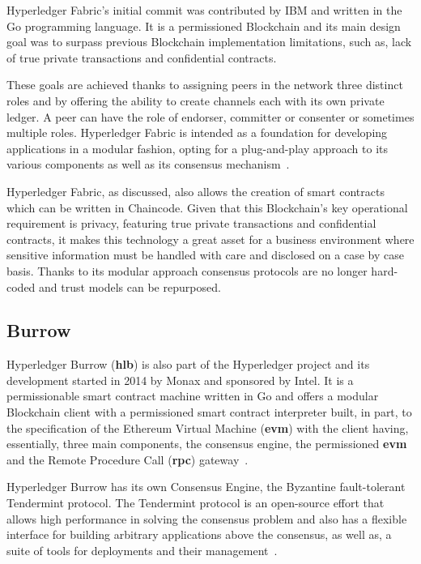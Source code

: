   Hyperledger Fabric’s initial commit was contributed by IBM and written in the
  Go programming language.  It is a permissioned Blockchain and its main design
  goal was to surpass previous Blockchain implementation limitations, such as,
  lack of true private transactions and confidential contracts.

  These goals are achieved thanks to assigning peers in the network three
  distinct roles and by offering the ability to create channels each with its
  own private ledger.  A peer can have the role of endorser, committer or
  consenter or sometimes multiple roles.  Hyperledger Fabric is intended as a
  foundation for developing applications in a modular fashion, opting for a
  plug-and-play approach to its various components as well as its consensus
  mechanism~\cite{HyperledgerFabricDocs2017}.

  Hyperledger Fabric, as discussed, also allows the creation of smart contracts
  which can be written in Chaincode.  Given that this Blockchain's key
  operational requirement is privacy, featuring true private transactions and
  confidential contracts, it makes this technology a great asset for a business
  environment where sensitive information must be handled with care and
  disclosed on a case by case basis.  Thanks to its modular approach consensus
  protocols are no longer hard-coded and trust models can be repurposed.

  \subsection{Burrow}

  Hyperledger Burrow (\textbf{hlb}) is also part of the Hyperledger project and
  its development started in 2014 by Monax and sponsored by Intel. It is a
  permissionable smart contract machine written in Go and offers a modular
  Blockchain client with a permissioned smart contract interpreter built, in
  part, to the specification of the Ethereum Virtual Machine (\textbf{evm})
  with the client having, essentially, three main components, the consensus
  engine, the permissioned \textbf{evm} and the Remote Procedure Call
  (\textbf{rpc}) gateway~\cite{Kuhlman2017,HyperledgerBurrow2017}.

  Hyperledger Burrow has its own Consensus Engine, the Byzantine fault-tolerant
  Tendermint protocol.  The Tendermint protocol is an open-source effort that
  allows high performance in solving the consensus problem and also has a
  flexible interface for building arbitrary applications above the consensus,
  as well as, a suite of tools for deployments and their
  management~\cite{Buchman2016}.
